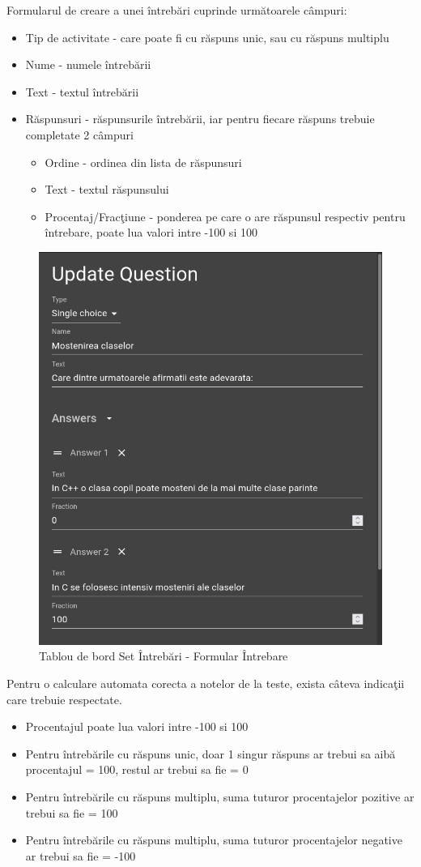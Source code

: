 \documentclass[12pt, a4paper, oneside, romanian]{teza-upb}
\begin{document}
Formularul de creare a unei întrebări cuprinde următoarele câmpuri:
\begin{itemize}
	\item Tip de activitate - care poate fi cu răspuns unic, sau cu răspuns multiplu
	\item Nume - numele întrebării
	\item Text - textul întrebării
	\item Răspunsuri - răspunsurile întrebării, iar pentru fiecare răspuns trebuie completate 2 câmpuri
		\begin{itemize}
			\item Ordine - ordinea din lista de răspunsuri
			\item Text - textul răspunsului
			\item Procentaj/Fracţiune - ponderea pe care o are răspunsul respectiv pentru întrebare, poate lua valori intre -100 si 100
		\end{itemize}
\end{itemize}

\begin{figure}[H]
\centering
\includegraphics*[width=0.7\columnwidth]{tablou-de-bord-set-intrebari-formular-intrebare}
\caption{Tablou de bord Set Întrebări - Formular Întrebare}
\label{tablou-de-bord-set-intrebari-formular-intrebare}
\end{figure}

Pentru o calculare automata corecta a notelor de la teste, exista câteva indicaţii care trebuie respectate.
\begin{itemize}
	\item Procentajul poate lua valori intre -100 si 100
	\item Pentru întrebările cu răspuns unic, doar 1 singur răspuns ar trebui sa aibă procentajul = 100, restul ar trebui sa fie = 0
	\item Pentru întrebările cu răspuns multiplu, suma tuturor procentajelor pozitive ar trebui sa fie = 100
	\item Pentru întrebările cu răspuns multiplu, suma tuturor procentajelor negative ar trebui sa fie = -100
\end{itemize}
\end{document}
